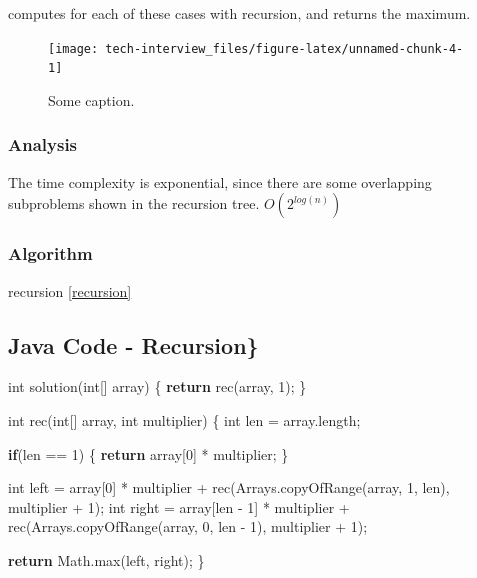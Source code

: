 \documentclass[]{book}
\newenvironment{Shaded}{\begin{snugshade}}{\end{snugshade}}
\newcommand{\BuiltInTok}[1]{#1}
\newcommand{\DataTypeTok}[1]{\textcolor[rgb]{0.13,0.29,0.53}{#1}}
\newcommand{\DecValTok}[1]{\textcolor[rgb]{0.00,0.00,0.81}{#1}}
\newcommand{\FunctionTok}[1]{\textcolor[rgb]{0.00,0.00,0.00}{#1}}
\newcommand{\KeywordTok}[1]{\textcolor[rgb]{0.13,0.29,0.53}{\textbf{#1}}}
\newcommand{\NormalTok}[1]{#1}
\begin{document}
computes for each of these cases with recursion, and returns the maximum.

\begin{figure}
\texttt{[image: tech-interview\_files/figure-latex/unnamed-chunk-4-1]} \caption{Some caption.}\label{fig:unnamed-chunk-4}
\end{figure}

\hypertarget{analysis-40}{%
\subsubsection{Analysis}\label{analysis-40}}

The time complexity is exponential, since there are some overlapping subproblems shown in the recursion tree.
\(O(2^{log(n)})\)

\hypertarget{algorithm-40}{%
\subsubsection{Algorithm}\label{algorithm-40}}

recursion \ref{recursion}

\hypertarget{java-code---recursion}{%
\subsection{Java Code - Recursion\}}\label{java-code---recursion}}

\begin{Shaded}
\begin{Highlighting}[]
\DataTypeTok{int} \FunctionTok{solution}\NormalTok{(}\DataTypeTok{int}\NormalTok{[] array) \{}
    \KeywordTok{return} \FunctionTok{rec}\NormalTok{(array, }\DecValTok{1}\NormalTok{);}
\NormalTok{\}}

\DataTypeTok{int} \FunctionTok{rec}\NormalTok{(}\DataTypeTok{int}\NormalTok{[] array, }\DataTypeTok{int}\NormalTok{ multiplier) \{}
    \DataTypeTok{int}\NormalTok{ len = array.}\FunctionTok{length}\NormalTok{;}

    \KeywordTok{if}\NormalTok{(len == }\DecValTok{1}\NormalTok{) \{}
        \KeywordTok{return}\NormalTok{ array[}\DecValTok{0}\NormalTok{] * multiplier;}
\NormalTok{    \}}

    \DataTypeTok{int}\NormalTok{ left = array[}\DecValTok{0}\NormalTok{] * multiplier + }\FunctionTok{rec}\NormalTok{(}\BuiltInTok{Arrays}\NormalTok{.}\FunctionTok{copyOfRange}\NormalTok{(array, }\DecValTok{1}\NormalTok{, len), multiplier + }\DecValTok{1}\NormalTok{);}
    \DataTypeTok{int}\NormalTok{ right = array[len - }\DecValTok{1}\NormalTok{] * multiplier + }\FunctionTok{rec}\NormalTok{(}\BuiltInTok{Arrays}\NormalTok{.}\FunctionTok{copyOfRange}\NormalTok{(array, }\DecValTok{0}\NormalTok{, len - }\DecValTok{1}\NormalTok{), multiplier + }\DecValTok{1}\NormalTok{);}

    \KeywordTok{return} \BuiltInTok{Math}\NormalTok{.}\FunctionTok{max}\NormalTok{(left, right);}
\NormalTok{\}}
\end{Highlighting}
\end{Shaded}
\end{document}

